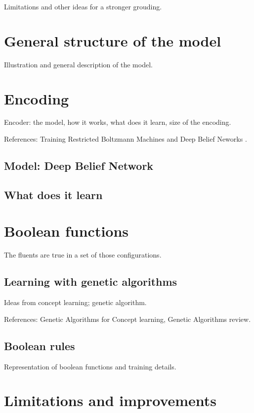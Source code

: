 Limitations and other ideas for a stronger grouding.

\section{General structure of the model}

Illustration and general description of the model.

\section{Encoding}

Encoder: the model, how it works, what does it learn, size of the encoding.

References:
Training Restricted Boltzmann Machines and Deep Belief Neworks
\cite{bib:rbm-training}\cite{bib:ml-book-murphy}.

\subsection{Model: Deep Belief Network}

\subsection{What does it learn}


\section{Boolean functions}

The fluents are true in a set of those configurations.

\subsection{Learning with genetic algorithms}

Ideas from concept learning; genetic algorithm.

References:
Genetic Algorithms for Concept learning\cite{bib:ga-for-concepts},
Genetic Algorithms review\cite{bib:ga-mutations-review}.

\subsection{Boolean rules}

Representation of boolean functions and training details.

\section{Limitations and improvements}

\label{sec:fluents-limitations}


